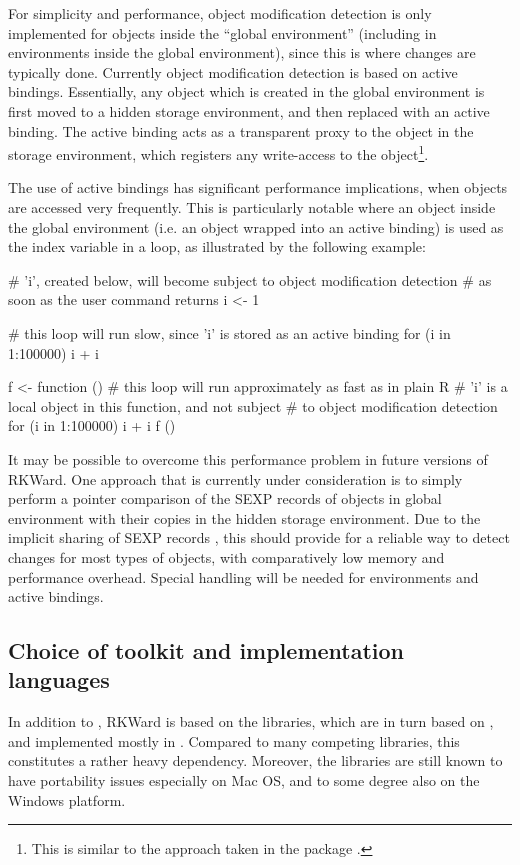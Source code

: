 For simplicity and performance, object modification detection is only
implemented for objects inside the ``global environment'' (including in environments
inside the global environment), since this is where changes are typically done.
Currently object modification detection is based on active bindings.
Essentially, any object which is created in the global environment is first
moved to a hidden storage environment, and then replaced with an active binding.
The active binding acts as a transparent proxy to the object in the storage
environment, which registers any write-access to the object\footnote{
    This is similar to the approach taken in the  package \citep{Plate2009}.
}.

The use of active bindings has significant performance implications, when
objects are accessed very frequently. This is particularly notable where an
object inside the global environment (i.e. an object wrapped into an active
binding) is used as the index variable in a loop, as illustrated by the
following example:

\begin{Code}
# 'i', created below, will become subject to object modification detection
# as soon as the user command returns
i <- 1

# this loop will run slow, since 'i' is stored as an active binding
for (i in 1:100000) i + i

f <- function () {
    # this loop will run approximately as fast as in plain R
    # 'i' is a local object in this function, and not subject
    # to object modification detection
    for (i in 1:100000) i + i
}
f ()
\end{Code}

It may be possible to overcome this performance problem in future versions of
RKWard. One approach that is currently under consideration is to simply perform
a pointer comparison of the SEXP records of objects in global environment with
their copies in the hidden storage environment. Due to the implicit sharing of
SEXP records \citep{RDCT2010a, RDCT2010b}, this should provide for a reliable
way to detect changes for most types of  objects, with comparatively low memory
and performance overhead. Special handling will be needed for environments and
active bindings.

\subsection{Choice of toolkit and implementation languages}
\label{sec:technical_toolkit}
In addition to , RKWard is based on the  libraries, which are in turn based
on , and implemented mostly in . Compared to many competing libraries,
this constitutes a rather heavy dependency. Moreover, the  libraries are
still known to have portability issues especially on Mac OS, and to some degree
also on the Windows platform.

